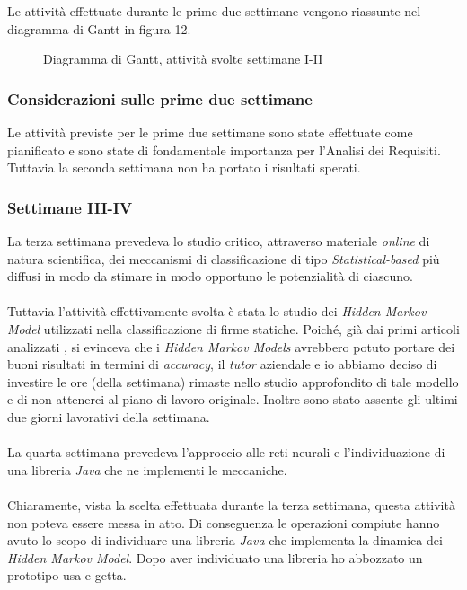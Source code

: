 Le attività effettuate durante le prime due settimane vengono riassunte nel diagramma di Gantt in figura 12.
\begin{figure}[H]
\centering
\noindent{}
\caption{Diagramma di Gantt, attività svolte settimane I-II}
\end{figure}
\subsubsection*{Considerazioni sulle prime due settimane}
\label{3.1.1.1}
Le attività previste per le prime due settimane sono state effettuate come pianificato e sono state di fondamentale importanza per l'Analisi dei Requisiti. Tuttavia la seconda settimana non ha portato i risultati sperati.
\subsubsection{Settimane III-IV}
\label{3.1.2}
La terza settimana prevedeva lo studio critico, attraverso materiale \emph{online} di natura scientifica, dei meccanismi di classificazione di tipo \emph{Statistical-based} più diffusi in modo da stimare in modo opportuno le potenzialità di ciascuno.\\\\
Tuttavia l'attività effettivamente svolta è stata lo studio dei \emph{Hidden Markov Model} utilizzati nella classificazione di firme statiche. Poiché, già dai primi articoli analizzati \cite{3}\cite{5}\cite{6}, si evinceva che i \emph{Hidden Markov Models} avrebbero potuto portare dei buoni risultati in termini di \emph{accuracy}, il \emph{tutor} aziendale e io abbiamo deciso di investire le ore (della settimana) rimaste nello studio approfondito di tale modello e di non attenerci al piano di lavoro originale. Inoltre sono stato assente gli ultimi due giorni lavorativi della settimana.\\\\
La quarta settimana prevedeva l'approccio alle reti neurali e l'individuazione di una libreria \emph{Java} che ne implementi le meccaniche.\\\\Chiaramente, vista la scelta effettuata durante la terza settimana, questa attività non poteva essere messa in atto. Di conseguenza le operazioni compiute hanno avuto lo scopo di individuare una libreria \emph{Java} che implementa la dinamica dei \emph{Hidden Markov Model}. Dopo aver individuato una libreria ho abbozzato un prototipo usa e getta.\\\\
